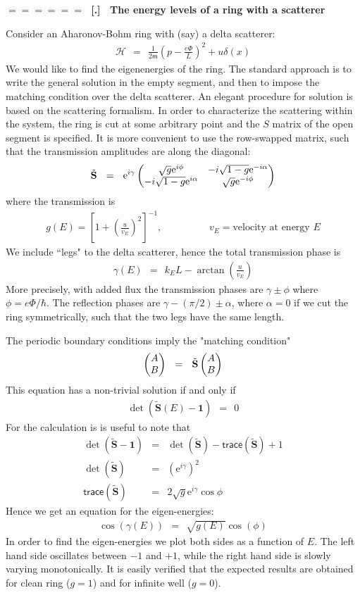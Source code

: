 \documentclass[onecolumn,fleqn]{revtex4}
\newcommand{\trc}{\mathsf{trace}}
\newcommand{\eexp}{\mathrm{e}^}
\newcommand{\mass}{\mathsf{m}}
\newcommand{\amatrix}[1]{\begin{matrix} #1 \end{matrix}}
\newcommand{\beq}{\begin{eqnarray}}
\newcommand{\eeq}{\end{eqnarray}}
\renewcommand{\thesubsection}{\arabic{subsection}}
\renewcommand{\thesubsubsection}{\arabic{subsubsection}}
\newcommand{\sheadC}[1]
{
\addtocounter{subsubsection}{1}
\vspace{5mm}
{\Large\bf $=\!=\!=\!=\!=\!=\;$ [\thesubsection.\thesubsubsection] \ #1}  
\nopagebreak
\phantomsection
}
\begin{document}
\sheadC{The energy levels of a ring with a scatterer}

Consider an Aharonov-Bohm ring with (say) a delta scatterer:
\beq
\mathcal{H} \ \ = \ \ 
\frac{1}{ 2\mass} 
\left( p - \frac{e\Phi}{L} \right)^2 
+ u \delta(x)
\eeq
We would like to find the eigenenergies of the ring.
The standard approach is to write the general solution 
in the empty segment, and then to impose the matching 
condition over the delta scatterer. An elegant procedure 
for solution is based on the scattering formalism. 
In order to characterize the scattering within the system, 
the ring is cut at some arbitrary point and the $S$ matrix of the 
open segment is specified. It is more convenient to  
use the row-swapped matrix, such that the transmission 
amplitudes are along the diagonal:
\beq
\tilde{\mathbf{S}} 
\ \ = \ \ 
\eexp{i\gamma}
\left( \amatrix{\sqrt{g}\eexp{i\phi} &  -i\sqrt{1-g}\eexp{-i\alpha} \cr
-i\sqrt{1-g}\eexp{i\alpha} & \sqrt{g}\eexp{-i\phi}} \right)
\eeq
where the transmission is 
\beq
g(E)=
\left[ 1 
+ \left( \frac{u}{v_E}\right)^2 
\right]^{-1},
\hspace{2cm} v_E = \mbox{velocity at energy $E$} 
\eeq
We include ``legs" to the delta scatterer, 
hence the total transmission phase is  
\beq
\gamma(E) \ \ = \ \ k_E L -\arctan\left( \frac{u}{v_E} \right) 
\eeq
More precisely, with added flux the transmission 
phases are $\gamma\pm\phi$ where $\phi=e\Phi/\hbar$. 
The reflection phases are ${\gamma-(\pi/2) \pm \alpha}$, 
where ${\alpha=0}$ if we cut the ring symmetrically, 
such that the two legs have the same length.  

The periodic boundary conditions imply the "matching condition" 
\beq
\left( \amatrix{ A \cr B } \right) \ \ = \ \  
\tilde{\mathbf{S}}
\left( \amatrix{ A \cr B } \right)
\eeq
This equation has a non-trivial solution if and only if   
\beq
\det(\tilde{\mathbf{S}}(E) -\bm{1}) \ \ = \ \ 0
\eeq
For the calculation is is useful to note that 
\beq
\det(\tilde{\mathbf{S}}-\bm{1}) &=& \det(\tilde{\mathbf{S}})-\trc{(\tilde{\mathbf{S}})}+1 \\
\det(\tilde{\mathbf{S}}) &=& (\eexp{i\gamma})^2  \\
\trc{(\tilde{\mathbf{S}})} &=& 2\sqrt{g}\eexp{i\gamma}\cos{\phi}
\eeq
Hence we get an equation for the eigen-energies:
\beq
\cos(\gamma(E)) \ \ = \ \ \sqrt{g(E)} \cos(\phi)
\eeq
In order to find the eigen-energies we plot both sides as 
a function of $E$. The left hand side oscillates
between $-1$ and $+1$,  while the right hand side 
is slowly varying monotonically. It is easily verified 
that the expected results are obtained for clean ring ($g=1$) 
and for infinite well ($g=0$). 
\end{document}
